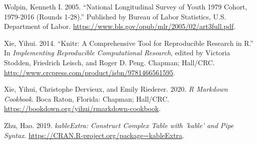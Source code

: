 \documentclass{article}
\newlength{\cslhangindent}
\newlength{\cslentryspacingunit} %
\newenvironment{CSLReferences}[2] %
 {%
  \setlength{\parindent}{0pt}
  \ifodd #1
  \let\oldpar\par
  \def\par{\hangindent=\cslhangindent\oldpar}
  \fi
  \setlength{\parskip}{#2\cslentryspacingunit}
 }%
 {}
\begin{document}
\begin{CSLReferences}{1}{0}
\leavevmode{}%
Wolpin, Kenneth I. 2005. {``National Longitudinal Survey of Youth 1979 Cohort, 1979-2016 (Rounds 1-28).''} Published by Bureau of Labor Statistics, U.S. Department of Labor. \url{https://www.bls.gov/opub/mlr/2005/02/art3full.pdf}.

\leavevmode{}%
Xie, Yihui. 2014. {``Knitr: A Comprehensive Tool for Reproducible Research in {R}.''} In \emph{Implementing Reproducible Computational Research}, edited by Victoria Stodden, Friedrich Leisch, and Roger D. Peng. Chapman; Hall/CRC. \url{http://www.crcpress.com/product/isbn/9781466561595}.

\leavevmode{}%
Xie, Yihui, Christophe Dervieux, and Emily Riederer. 2020. \emph{R Markdown Cookbook}. Boca Raton, Florida: Chapman; Hall/CRC. \url{https://bookdown.org/yihui/rmarkdown-cookbook}.

\leavevmode{}%
Zhu, Hao. 2019. \emph{{kableExtra: Construct Complex Table with 'kable' and Pipe Syntax}}. \url{https://CRAN.R-project.org/package=kableExtra}.

\end{CSLReferences}



\end{document}
